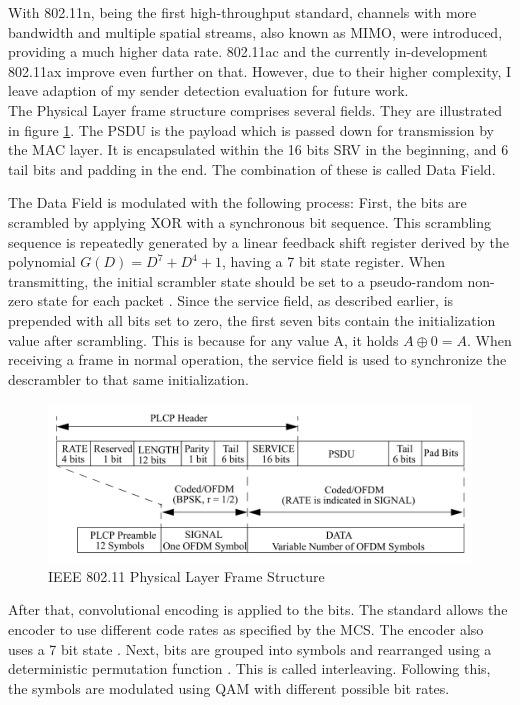 With 802.11n, being the first high-throughput standard, channels with more bandwidth and multiple spatial streams, also known as \gls{MIMO}, were introduced, providing a much higher data rate. 802.11ac and the currently in-development 802.11ax improve even further on that. However, due to their higher complexity, I leave adaption of my sender detection evaluation for future work.\\

The Physical Layer frame structure comprises several fields. They are illustrated in figure \ref{fig:phy-format}. The \gls{PSDU} is the payload which is passed down for transmission by the \gls{MAC} layer. It is encapsulated within the 16 bits \gls{SRV} in the beginning, and 6 tail bits and padding in the end. The combination of these is called Data Field.

The Data Field is modulated with the following process: First, the bits are scrambled by applying XOR with a synchronous bit sequence. This scrambling sequence is repeatedly generated by a linear feedback shift register derived by the polynomial $G(D)=D^7+D^4+1$, having a 7 bit state register. When transmitting, the initial scrambler state should be set to a pseudo-random non-zero state for each packet \cite{ieee2012}. Since the service field, as described earlier, is prepended with all bits set to zero, the first seven bits contain the initialization value after scrambling. This is because for any value A, it holds $A \oplus 0 = A$. When receiving a frame in normal operation, the service field is used to synchronize the descrambler to that same initialization.

\begin{figure}[H]
	\centering
	\includegraphics[width=\textwidth]{gfx/images/phy-format}
	\caption[IEEE 802.11 Physical Layer Frame Structure]{IEEE 802.11 Physical Layer Frame Structure \cite{ieee2012}}
	\label{fig:phy-format}
\end{figure}

After that, convolutional encoding is applied to the bits. The standard allows the encoder to use different code rates as specified by the \gls{MCS}. The encoder also uses a 7 bit state \cite{park2009}. Next, bits are grouped into symbols and rearranged using a deterministic permutation function \cite{perahia2013}. This is called interleaving. Following this, the symbols are modulated using \gls{QAM}	with different possible bit rates.\\

